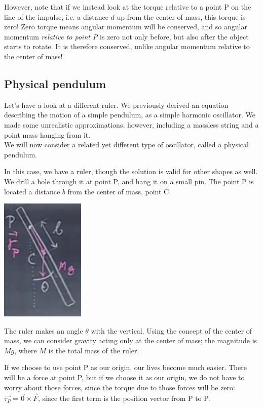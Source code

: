 \documentclass[12pt,a4paper]{report}
\begin{document}
However, note that if we instead look at the torque relative to a point P on the line of the impulse, i.e. a distance $d$ up from the center of mass, this torque is zero! Zero torque means angular momentum will be conserved, and so angular momentum \emph{relative to point P} is zero not only before, but also after the object starts to rotate. It is therefore conserved, unlike angular momentum relative to the center of mass!

\subsection{Physical pendulum}

Let's have a look at a different ruler. We previously derived an equation describing the motion of a simple pendulum, as a simple harmonic oscillator. We made some unrealistic approximations, however, including a massless string and a point mass hanging from it.\\
We will now consider a related yet different type of oscillator, called a physical pendulum.

In this case, we have a ruler, though the solution is valid for other shapes as well. We drill a hole through it at point P, and hang it on a small pin. The point P is located a distance $b$ from the center of mass, point C.

\begin{center}
\includegraphics[scale=0.7]{Graphics/lec21_physical_pendulum}
\end{center}

The ruler makes an angle $\theta$ with the vertical. Using the concept of the center of mass, we can consider gravity acting only at the center of mass; the magnitude is $M g$, where $M$ is the total mass of the ruler.

If we choose to use point P as our origin, our lives become much easier. There will be a force at point P, but if we choose it as our origin, we do not have to worry about those forces, since the torque due to those forces will be zero: $\vec{\tau_P} = \vec{0} \times \vec{F}$, since the first term is the position vector from P to P.
\end{document}
